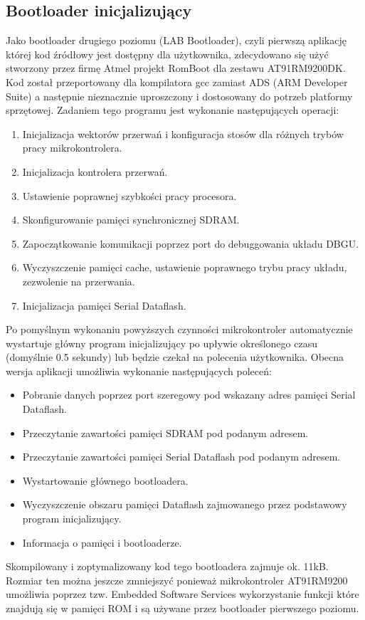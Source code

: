 \documentclass[a4paper,12pt]{book}
\begin{document}
			\subsection{Bootloader inicjalizujący}
				\label{sec:bootloader2nd}
				Jako bootloader drugiego poziomu (LAB Bootloader), czyli pierwszą aplikację której kod źródłowy jest dostępny dla użytkownika, zdecydowano się użyć stworzony przez firmę Atmel projekt RomBoot dla zestawu AT91RM9200DK\cite{website:arm_booting}. Kod został przeportowany dla kompilatora gcc zamiast ADS (ARM Developer Suite) a następnie nieznacznie uproszczony i dostosowany do potrzeb platformy sprzętowej. Zadaniem tego programu jest wykonanie następujących operacji:
				\begin{enumerate}
					\item Inicjalizacja wektorów przerwań i konfiguracja stosów dla różnych trybów pracy mikrokontrolera.
					\item Inicjalizacja kontrolera przerwań.
					\item Ustawienie poprawnej szybkości pracy procesora.
					\item Skonfigurowanie pamięci synchronicznej SDRAM.
					\item Zapoczątkowanie komunikacji poprzez port do debuggowania układu DBGU.
					\item Wyczyszczenie pamięci cache, ustawienie poprawnego trybu pracy układu, zezwolenie na przerwania.
					\item Inicjalizacja pamięci Serial Dataflash.
				\end{enumerate}
				Po pomyślnym wykonaniu powyższych czynności mikrokontroler automatycznie wystartuje główny program inicjalizujący po upływie określonego czasu (domyślnie 0.5 sekundy) lub będzie czekał na polecenia użytkownika. Obecna wersja aplikacji umożliwia wykonanie następujących poleceń:
				\begin{itemize}
					\item Pobranie danych poprzez port szeregowy pod wskazany adres pamięci Serial Dataflash.
					\item Przeczytanie zawartości pamięci SDRAM pod podanym adresem.
					\item Przeczytanie zawartości pamięci Serial Dataflash pod podanym adresem.
					\item Wystartowanie głównego bootloadera.
					\item Wyczyszczenie obszaru pamięci Dataflash zajmowanego przez podstawowy program inicjalizujący.
					\item Informacja o pamięci i bootloaderze.
				\end{itemize}
				Skompilowany i zoptymalizowany kod tego bootloadera zajmuje ok. 11kB. Rozmiar ten można jeszcze zmniejszyć ponieważ mikrokontroler AT91RM9200 umożliwia poprzez tzw. Embedded Software Services wykorzystanie funkcji które znajdują się w pamięci ROM i są używane przez bootloader pierwszego poziomu.
				
\end{document}
